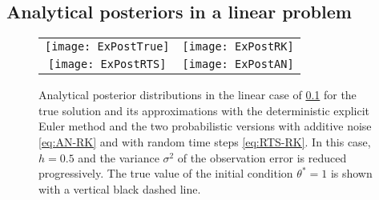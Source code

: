 \documentclass[10pt]{article}
\begin{document}
\subsection{Analytical posteriors in a linear problem}\label{sec:AnalyticalPosterior} 

\begin{figure}[t!]
	\begin{center}
		
		\vspace{0.2cm}
		\begin{tabular}{cc}
			\texttt{[image: ExPostTrue]} & \texttt{[image: ExPostRK]} \\[10pt] 
			\texttt{[image: ExPostRTS]}  & \texttt{[image: ExPostAN]}
		\end{tabular}	
	\end{center}
	\caption{Analytical posterior distributions in the linear case of \cref{sec:AnalyticalPosterior} for the true solution and its approximations with the deterministic explicit Euler method and the two probabilistic versions with additive noise \eqref{eq:AN-RK} and with random time steps \eqref{eq:RTS-RK}. In this case, $h = 0.5$ and the variance $\sigma^2$ of the observation error is reduced progressively. The true value of the initial condition $\theta^* = 1$ is shown with a vertical black dashed line.}
	\label{fig:AnalyticalPosterior}
\end{figure}
\end{document}
